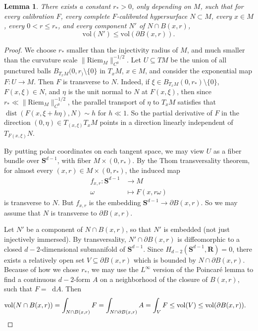 \documentclass[reqno,11pt]{amsart}
\newcommand{\RR}{\mathbf{R}}
\newcommand{\Sph}{\mathbf S}
\newcommand*\dif{\mathop{}\!\mathrm{d}}
\DeclareMathOperator{\dist}{dist}
\newcommand{\vol}{\mathrm{vol}}
\newcommand{\Riem}{\mathrm{Riem}}
\newtheorem{lemma}[theorem]{Lemma}
\theoremstyle{definition}
\numberwithin{equation}{section}
\begin{document}
\begin{lemma}
There exists a constant $r_* > 0$, only depending on $M$, such that for every calibration $F$, every complete $F$-calibrated hypersurface $N \subset M$, every $x \in M$, every $0 < r \leq r_*$, and every component $N'$ of $N \cap B(x, r)$,
\begin{equation}\label{area bound for calibrated}
\vol(N') \leq \vol(\partial B(x, r)).
\end{equation}
\end{lemma}
\begin{proof}
We choose $r_*$ smaller than the injectivity radius of $M$, and much smaller than the curvature scale $\|\Riem_M\|_{C^0}^{-1/2}$.
Let $U \subseteq TM$ be the union of all punctured balls $B_{T_x M}(0, r_) \setminus \{0\}$ in $T_x M$, $x \in M$, and consider the exponential map $F: U \to M$.
Then $F$ is transverse to $N$.
Indeed, if $\xi \in B_{T_x M}(0, r_*) \setminus \{0\}$, $F(x, \xi) \in N$, and $\eta$ is the unit normal to $N$ at $F(x, \xi)$, then since $r_* \ll \|\Riem_M\|_{C^0}^{-1/2}$, the parallel transport of $\eta$ to $T_x M$ satisfies that $\dist(F(x, \xi + h\eta), N) \sim h$ for $h \ll 1$.
So the partial derivative of $F$ in the direction $(0, \eta) \in T_{(x, \xi)} T_x M$ points in a direction linearly independent of $T_{F(x, \xi)} N$.

By putting polar coordinates on each tangent space, we may view $U$ as a fiber bundle over $\Sph^{d - 1}$, with fiber $M \times (0, r_*)$.
By the Thom transversality theorem, for almost every $(x, r) \in M \times (0, r_*)$, the induced map
\begin{align*}
f_{x, r}: \Sph^{d - 1} &\to M \\
\omega &\mapsto F(x, r\omega)
\end{align*}
is transverse to $N$.
But $f_{x, r}$ is the embedding $\Sph^{d - 1} \to \partial B(x, r)$.
So we may assume that $N$ is transverse to $\partial B(x, r)$.

Let $N'$ be a component of $N \cap B(x, r)$, so that $N'$ is embedded (not just injectively immersed).
By transversality, $N' \cap \partial B(x, r)$ is diffeomorphic to a closed $d - 2$-dimensional submanifold of $\Sph^{d - 1}$.
Since $H_{d - 2}(\Sph^{d - 1}, \RR) = 0$, there exists a relatively open set $V \subseteq \partial B(x, r)$ which is bounded by $N \cap \partial B(x, r)$.
Because of how we chose $r_*$, we may use the $L^\infty$ version of the Poincar\'e lemma \cite[Proposition A.1]{BackusBest1} to find a continuous $d - 2$-form $A$ on a neighborhood of the closure of $B(x, r)$, such that $F = \dif A$.
Then
\begin{align*}
\vol(N \cap B(x, r)) &= \int_{N \cap B(x, r)} F = \int_{N \cap \partial B(x, r)} A = \int_V F \leq \vol(V) \leq \vol(\partial B(x, r)). \qedhere
\end{align*}
\end{proof}
\end{document}

